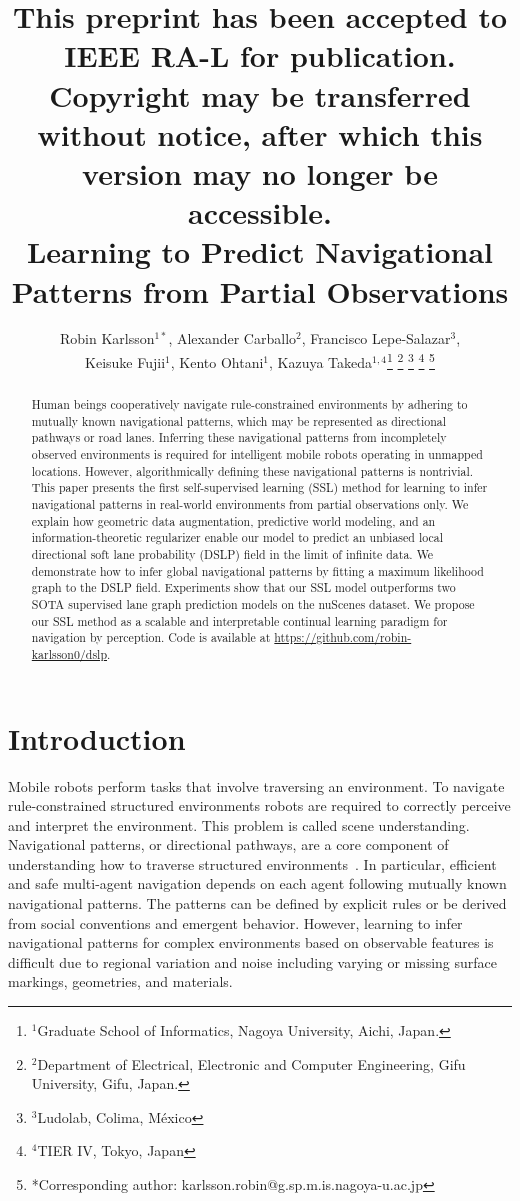 \documentclass[letterpaper, 10 pt, conference]{ieeeconf}
\title{\scriptsize This preprint has been accepted to IEEE RA-L for publication. Copyright may be transferred without notice, after which this version may no longer be accessible. \\ \LARGE \bf
Learning to Predict Navigational Patterns from Partial Observations
}
\author{Robin Karlsson$^{1*}$, Alexander Carballo$^{2}$, Francisco Lepe-Salazar$^{3}$, \\ Keisuke Fujii$^{1}$, Kento Ohtani$^{1}$, Kazuya Takeda$^{1,4}$\thanks{$^{1}$Graduate School of Informatics, Nagoya University, Aichi, Japan.}
\thanks{$^{2}$Department of Electrical, Electronic and Computer Engineering, Gifu University, Gifu, Japan.}
\thanks{$^{3}$Ludolab, Colima, M\'exico}
\thanks{$^{4}$TIER IV, Tokyo, Japan}
\thanks{*Corresponding author: karlsson.robin@g.sp.m.is.nagoya-u.ac.jp}}
\begin{document}
\maketitle
\thispagestyle{plain}
\pagestyle{plain}

\begin{abstract}
Human beings cooperatively navigate rule-constrained environments by adhering to mutually known navigational patterns, which may be represented as directional pathways or road lanes.
Inferring these navigational patterns from incompletely observed environments is required for intelligent mobile robots operating in unmapped locations. However, algorithmically defining these navigational patterns is nontrivial.
This paper presents the first self-supervised learning (SSL) method for learning to infer navigational patterns in real-world environments from partial observations only.
We explain how geometric data augmentation, predictive world modeling, and an information-theoretic regularizer enable our model to predict an unbiased local directional soft lane probability (DSLP) field in the limit of infinite data.
We demonstrate how to infer global navigational patterns by fitting a maximum likelihood graph to the DSLP field.
Experiments show that our SSL model outperforms two SOTA supervised lane graph prediction models on the nuScenes dataset.
We propose our SSL method as a scalable and interpretable continual learning paradigm for navigation by perception. Code is available at \url{https://github.com/robin-karlsson0/dslp}.

\end{abstract}

\section{Introduction}

Mobile robots perform tasks that involve traversing an environment. 
To navigate rule-constrained structured environments robots are required to correctly perceive and interpret the environment. This problem is called scene understanding.
Navigational patterns, or directional pathways, are a core component of understanding how to traverse structured environments~\cite{krause2013robot_navigation}.
In particular, efficient and safe multi-agent navigation depends on each agent following mutually known navigational patterns. The patterns can be defined by explicit rules or be derived from social conventions and emergent behavior.
However, learning to infer navigational patterns for complex environments based on observable features is difficult due to regional variation and noise including varying or missing surface markings, geometries, and materials.
\end{document}
